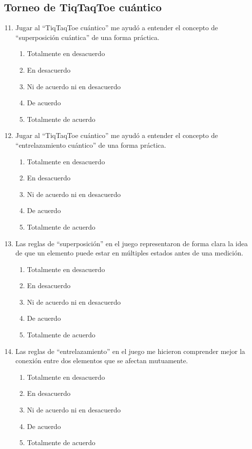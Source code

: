 \documentclass[10pt,a4paper]{article}
\begin{document}
\subsection{Torneo de TiqTaqToe cuántico}
\begin{enumerate}
    \setcounter{enumi}{10} %
    \item Jugar al ``TiqTaqToe cuántico'' me ayudó a entender el concepto de ``superposición cuántica'' de una forma práctica.
    \begin{enumerate}[label=\alph*)]
        \item Totalmente en desacuerdo
        \item En desacuerdo
        \item Ni de acuerdo ni en desacuerdo
        \item De acuerdo
        \item Totalmente de acuerdo
    \end{enumerate}

    \item Jugar al ``TiqTaqToe cuántico'' me ayudó a entender el concepto de ``entrelazamiento cuántico'' de una forma práctica.
    \begin{enumerate}[label=\alph*)]
        \item Totalmente en desacuerdo
        \item En desacuerdo
        \item Ni de acuerdo ni en desacuerdo
        \item De acuerdo
        \item Totalmente de acuerdo
    \end{enumerate}

    \item Las reglas de ``superposición'' en el juego representaron de forma clara la idea de que un elemento puede estar en múltiples estados antes de una medición.
    \begin{enumerate}[label=\alph*)]
        \item Totalmente en desacuerdo
        \item En desacuerdo
        \item Ni de acuerdo ni en desacuerdo
        \item De acuerdo
        \item Totalmente de acuerdo
    \end{enumerate}

    \item Las reglas de ``entrelazamiento'' en el juego me hicieron comprender mejor la conexión entre dos elementos que se afectan mutuamente.
    \begin{enumerate}[label=\alph*)]
        \item Totalmente en desacuerdo
        \item En desacuerdo
        \item Ni de acuerdo ni en desacuerdo
        \item De acuerdo
        \item Totalmente de acuerdo
    \end{enumerate}


\end{enumerate}
\end{document}
